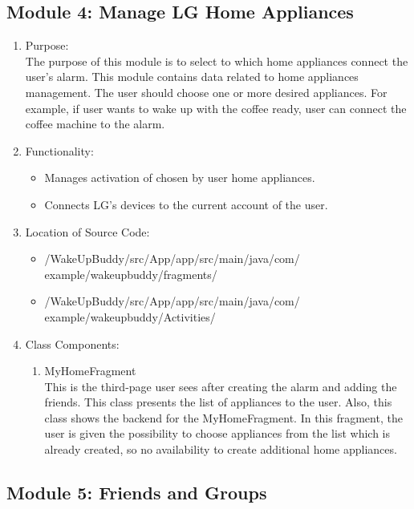 \documentclass[conference]{IEEEtran}
\begin{document}
\subsection{Module 4: Manage LG Home Appliances}
\begin{enumerate}
    \item Purpose: \\
    The purpose of this module is to select to which home appliances connect the user's alarm.  This module contains data related to home appliances management. The user should choose one or more desired appliances. For example, if user wants to wake up with the coffee ready, user can connect the coffee machine to the alarm.\\ 

    \item Functionality: 
    \begin{itemize}
        \item Manages activation of chosen by user home appliances.
        \item Connects LG’s devices to the current account of the user.
    \end{itemize} 
    \item Location of Source Code:
    \begin{itemize}
        \item /WakeUpBuddy/src/App/app/src/main/java/com/
        example/wakeupbuddy/fragments/
        \item /WakeUpBuddy/src/App/app/src/main/java/com/
        example/wakeupbuddy/Activities/
    \end{itemize} 
    \item Class Components:
    \begin{enumerate}
        \item MyHomeFragment \\
            This is the third-page user sees after creating the alarm and adding the friends. This class presents the list of appliances to the user.  Also, this class shows the backend for the MyHomeFragment. In this fragment, the user is given the possibility to choose appliances from the list which is already created, so no availability to create additional home appliances. \\
        
    \end{enumerate}
\end{enumerate}

\subsection{Module 5: Friends and Groups}
\end{document}

